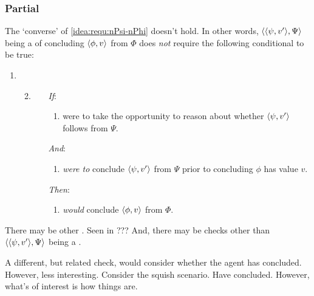 \subsubsection{Partial}

\begin{note}
  The `converse' of \ref{idea:requ:nPsi-nPhi} doesn't hold.
  In other words, \(\langle \langle \psi, v' \rangle, \Psi \rangle\) being a \requ{} of concluding \(\langle \phi, v \rangle\) from \(\Phi\) does \emph{not} require the following conditional to be true:
  \begin{enumerate}[label=]
  \item
    \begin{enumerate}[label=]
      \setcounter{enumi}{1}
    \item
      \label{idea:requ:nPsi-nPhi:conv}
      \begin{enumerate}
      \item[\emph{If}:]
        \begin{enumerate}[label=\alph*., ref=\named{R:b.\alph*}]
        \item
          \vAgent{} were to take the opportunity to reason about whether \(\langle \psi, v' \rangle\) follows from \(\Psi\).
        \end{enumerate}
      \item[\emph{And}:]
        \begin{enumerate}[label=\alph*., ref=\named{R:b.\alph*}, resume]
        \item
          \vAgent{} \emph{were to} conclude \(\langle \psi, v' \rangle\) from \(\Psi\) prior to concluding \(\phi\) has value \(v\).
        \end{enumerate}
      \item[\emph{Then}:]
        \begin{enumerate}[label=\alph*., ref=\named{R:b.\alph*}, resume]
        \item
          \vAgent{} \emph{would} conclude \(\langle \phi, v \rangle\) from \(\Phi\).
        \end{enumerate}
      \end{enumerate}
    \end{enumerate}
  \end{enumerate}

  There may be other .
  {
    \color{red}
    Seen in ???
  }
  And, there may be checks other than \(\langle \langle \psi, v' \rangle, \Psi \rangle\) being a \requ{}.

  A different, but related check, would consider whether the agent has concluded.
  However, less interesting.
  Consider the squish scenario.
  Have concluded.
  However, what's of interest is how things are.
\end{note}

